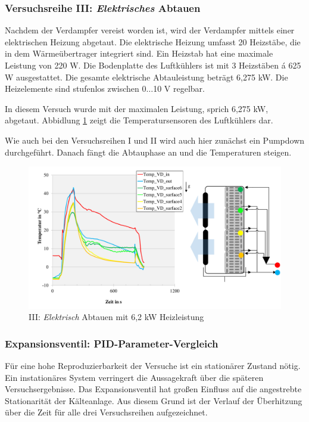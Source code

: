 \subsubsection*{Versuchsreihe III:  \textit{Elektrisches} Abtauen}

Nachdem der Verdampfer vereist worden ist, wird der Verdampfer mittels einer elektrischen Heizung abgetaut. Die elektrische Heizung umfasst 20 Heizstäbe, die in dem Wärmeübertrager integriert sind. Ein Heizstab hat eine maximale Leistung von 220 W. Die Bodenplatte des Luftkühlers ist mit 3 Heizstäben á 625 W ausgestattet. Die gesamte elektrische Abtauleistung beträgt 6,275 kW. Die Heizelemente sind stufenlos zwischen 0$\dots$10 V regelbar.  

In diesem Versuch wurde mit der maximalen Leistung, sprich 6,275 kW, abgetaut. Abbidlung \ref{fig:III_Elektrisch} zeigt die Temperatursensoren des Luftkühlers dar. 

Wie auch bei den Versuchsreihen I und II wird auch hier zunächst ein Pumpdown durchgeführt. Danach fängt die Abtauphase an und die Temperaturen steigen. 

\begin{figure}[htb]
\centering		\includegraphics[page=3,width=1.08\textwidth]{Pictures/Inbetriebnahme/Abtaumethoden_Tempverlaufe.pdf}
\caption{III: \textit{Elektrisch} Abtauen mit 6,2 kW Heizleistung}
\label{fig:III_Elektrisch}
\end{figure}

\subsubsection*{Expansionsventil: PID-Parameter-Vergleich}
\label{subsubsec:EV}

Für eine hohe Reproduzierbarkeit der Versuche ist ein stationärer Zustand nötig. Ein instationäres System verringert die Aussagekraft über die späteren Versuchsergebnisse. Das Expansionsventil hat großen Einfluss auf die angestrebte Stationarität der Kälteanlage. Aus diesem Grund ist der Verlauf der Überhitzung über die Zeit für alle drei Versuchsreihen aufgezeichnet. 

